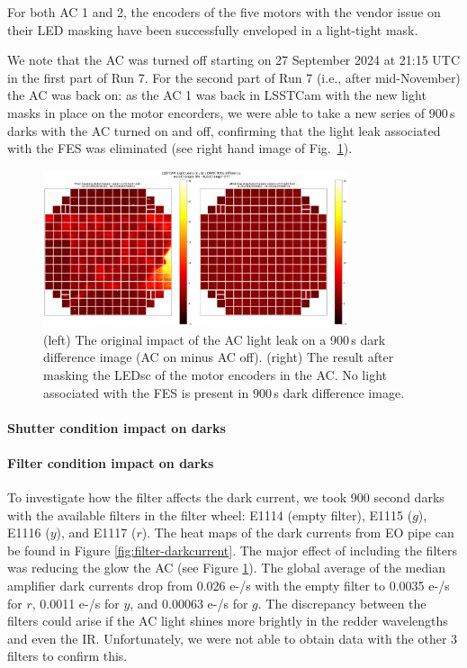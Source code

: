 For both AC 1 and 2, the encoders of the five motors with the vendor issue on
their LED masking have been successfully enveloped in a light-tight
mask.

We note that the AC was turned off starting on 27 September 2024 at 21:15 UTC in the
first part of Run 7. For the second part of Run 7 (i.e., after
mid-November) the AC was back on: as the AC 1 was back in LSSTCam with
the new light masks in place on the motor encorders, we were able to take a new series of
900\,s darks with the AC turned on and off, confirming that the light leak
associated with the FES was eliminated (see right hand image of Fig.~\ref{fig:ac-light-leak}).

\begin{figure}
\begin{centering}
\includegraphics[width=0.8\textwidth]{figures/AC_LightLeak_study.png}
\caption{ (left) The original impact of the AC light leak on a 900\,s dark difference image (AC on minus AC off). (right) The result after masking the LEDsc of the motor encoders in the AC.  No light associated with the FES is present in 900\,s dark difference image.  \label{fig:ac-light-leak}}
\end{centering}
\end{figure}

\paragraph{Shutter condition impact on
darks}\label{shutter-condition-impact-on-darks}

\paragraph{Filter condition impact on
darks}\label{filter-condition-impact-on-darks}

To investigate how the filter affects the dark current, we took 900 second darks with the available filters in the filter wheel: E1114 (empty filter), E1115 ($g$), E1116 ($y$), and E1117 ($r$). The heat maps of the dark currents from EO pipe can be found in Figure \ref{fig:filter-darkcurrent}. The major effect of including the filters was reducing the glow the AC (see Figure \ref{fig:ac-light-leak}). The global average of the median amplifier dark currents drop from 0.026 e-/s with the empty filter to 0.0035 e-/s for $r$, 0.0011 e-/s for $y$, and 0.00063 e-/s for $g$. The discrepancy between the filters could arise if the AC light shines more brightly in the redder wavelengths and even the IR. Unfortunately, we were not able to obtain data with the other 3 filters to confirm this.

